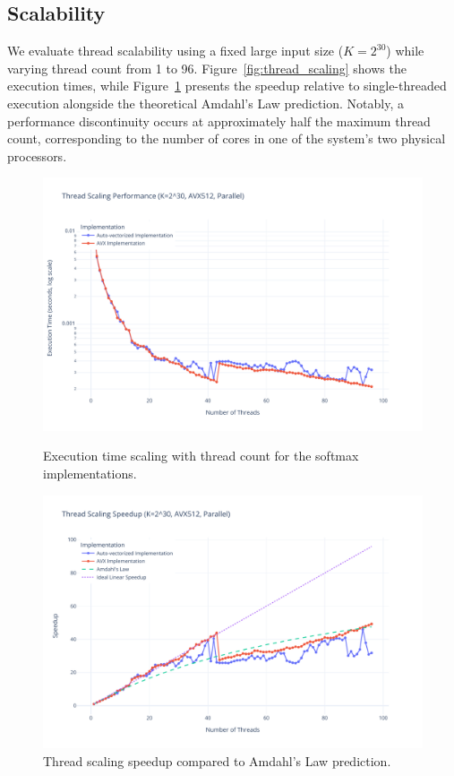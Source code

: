 \documentclass[10pt]{article}
\begin{document}
\subsection*{Scalability}

We evaluate thread scalability using a fixed large input size ($K = 2^{30}$) while varying thread count from 1 to 96. Figure~\ref{fig:thread_scaling} shows the execution times, while Figure~\ref{fig:thread_speedup} presents the speedup relative to single-threaded execution alongside the theoretical Amdahl's Law prediction. Notably, a performance discontinuity occurs at approximately half the maximum thread count, corresponding to the number of cores in one of the system's two physical processors.

\begin{figure}[H]
  \centering
  \begin{minipage}{0.48\textwidth}
    \centering
    \includegraphics[width=\textwidth]{../images/thread_scaling/thread_scaling_avx512.pdf}
    \caption{Execution time scaling with thread count for the softmax implementations.}
    \label{fig:thread_scaling}
  \end{minipage}
  \hfill
  \begin{minipage}{0.48\textwidth}
    \centering
    \includegraphics[width=\textwidth]{../images/thread_scaling/thread_scaling_speedup_avx512.pdf}
    \caption{Thread scaling speedup compared to Amdahl's Law prediction.}
    \label{fig:thread_speedup}
  \end{minipage}
\end{figure}
\end{document}
